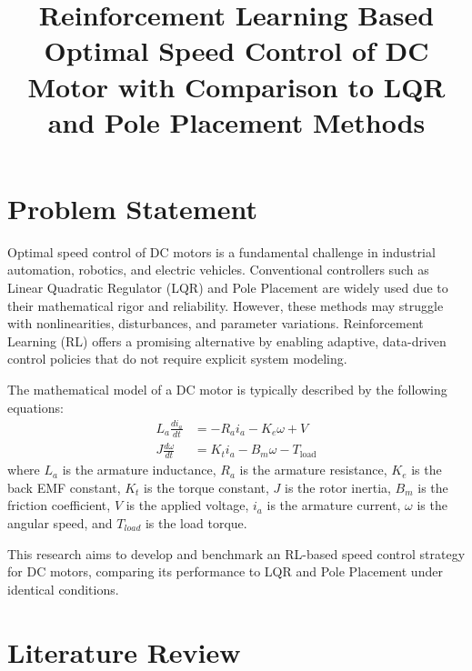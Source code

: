 \documentclass[conference]{IEEEtran}
\begin{document}
\title{Reinforcement Learning Based Optimal Speed Control of DC Motor with Comparison to LQR and Pole Placement Methods}

\author{
}

\maketitle
\IEEEpeerreviewmaketitle

\section{Problem Statement}

Optimal speed control of DC motors is a fundamental challenge in industrial automation, robotics, and electric vehicles. Conventional controllers such as Linear Quadratic Regulator (LQR) and Pole Placement are widely used due to their mathematical rigor and reliability. However, these methods may struggle with nonlinearities, disturbances, and parameter variations. Reinforcement Learning (RL) offers a promising alternative by enabling adaptive, data-driven control policies that do not require explicit system modeling.

The mathematical model of a DC motor is typically described by the following equations:
\begin{equation}
\begin{aligned}
L_{a} \frac{d i_{a}}{dt} &= -R_{a} i_{a} - K_{e} \omega + V \\
J \frac{d \omega}{dt} &= K_{t} i_{a} - B_{m} \omega - T_{\text{load}}
\end{aligned}
\end{equation}
where $L_a$ is the armature inductance, $R_a$ is the armature resistance, $K_e$ is the back EMF constant, $K_t$ is the torque constant, $J$ is the rotor inertia, $B_m$ is the friction coefficient, $V$ is the applied voltage, $i_a$ is the armature current, $\omega$ is the angular speed, and $T_{load}$ is the load torque.

This research aims to develop and benchmark an RL-based speed control strategy for DC motors, comparing its performance to LQR and Pole Placement under identical conditions.

\section{Literature Review}
\end{document}
